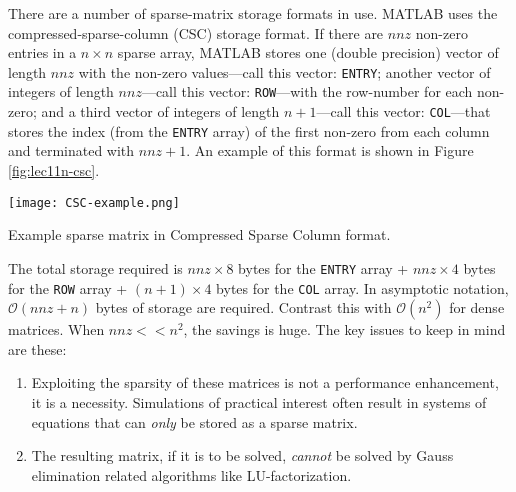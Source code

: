 There are a number of sparse-matrix storage formats in use.  MATLAB uses the compressed-sparse-column (CSC) storage format.\cite{gilbert1992sparse}  If there are $nnz$ non-zero entries in a $n \times n$ sparse array, MATLAB stores one (double precision) vector of length $nnz$ with the non-zero values---call this vector: \lstinline[style=myMatlab]{ENTRY}; another vector of integers of length $nnz$---call this vector: \lstinline[style=myMatlab]{ROW}---with the row-number for each non-zero; and a third vector of integers of length $n+1$---call this vector: \lstinline[style=myMatlab]{COL}---that stores the index (from the \lstinline[style=myMatlab]{ENTRY} array) of the first non-zero from each column and terminated with $nnz+1$.  An example of this format is shown in Figure \ref{fig:lec11n-csc}. \begin{marginfigure}
\texttt{[image: CSC-example.png]}
\caption{Example sparse matrix in Compressed Sparse Column format.}
\label{fig:lec11n-csc}
\end{marginfigure} The total storage required is $nnz \times 8$ bytes for the \lstinline[style=myMatlab]{ENTRY} array + $nnz \times 4$ bytes for the \lstinline[style=myMatlab]{ROW} array + $(n+1) \times 4$ bytes for the \lstinline[style=myMatlab]{COL} array.  In asymptotic notation, $\mathcal{O}(nnz+n)$ bytes of storage are required.  Contrast this with $\mathcal{O}(n^2)$ for dense matrices.  When $nnz << n^2$, the savings is huge.  The key issues to keep in mind are these:
\begin{enumerate}
\item Exploiting the sparsity of these matrices is not a performance enhancement, it is a necessity.  Simulations of practical interest often result in systems of equations that can \emph{only} be stored as a sparse matrix.
\item The resulting matrix, if it is to be solved, \emph{cannot} be solved by Gauss elimination related algorithms like LU-factorization.
\end{enumerate}

